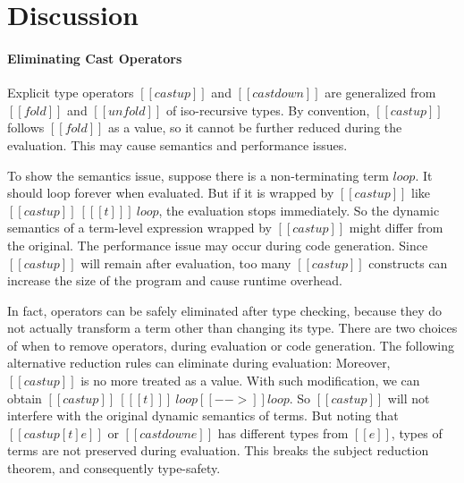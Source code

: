 \visiblecomments

\newlength{\blanklineskip}
\setlength{\blanklineskip}{0.66084ex}

\newcommand{\hsindent}[1]{\quad}%
\let\hspre\empty
\let\hspost\empty
\newcommand{\NB}{\textbf{NB}}
\newcommand{\Todo}[1]{$\langle$\textbf{To do:}~#1$\rangle$}

\EndFmtInput
\makeatother
%


\section{Discussion}

\paragraph{Eliminating Cast Operators}

Explicit type \cast operators $[[castup]]$ and $[[castdown]]$ are
generalized from $[[fold]]$ and $[[unfold]]$ of iso-recursive
types. By convention, $[[castup]]$ follows $[[fold]]$ as a value, so
it cannot be further reduced during the evaluation. This may cause
semantics and performance issues.

To show the semantics issue, suppose there is a non-terminating term
$\mathit{loop}$. It should loop forever when evaluated. But if it is
wrapped by $[[castup]]$ like $[[castup]]~[ [[t]] ]~\mathit{loop}$, the
evaluation stops immediately. So the dynamic semantics of a term-level
expression wrapped by $[[castup]]$ might differ from the original. The
performance issue may occur during code generation. Since $[[castup]]$
will remain after evaluation, too many $[[castup]]$ constructs can
increase the size of the program and cause runtime overhead.

In fact, \cast operators can be safely eliminated after type checking,
because they do not actually transform a term other than changing its
type. There are two choices of when to remove \cast operators, during
evaluation or code generation. The following alternative reduction
rules can eliminate \cast during evaluation:
\ottusedrule{\ottdruleSXXCastUpE{}}
\ottusedrule{\ottdruleSXXCastDownE{}} Moreover, $[[castup]]$ is no
more treated as a value. With such modification, we can obtain
$[[castup]]~[ [[t]] ]~\mathit{loop} [[-->]] \mathit{loop}$. So
$[[castup]]$ will not interfere with the original dynamic semantics of
terms. But noting that $[[castup [t] e]]$ or $[[castdown e]]$ has
different types from $[[e]]$, types of terms are not preserved during
evaluation. This breaks the subject reduction theorem, and
consequently type-safety.

